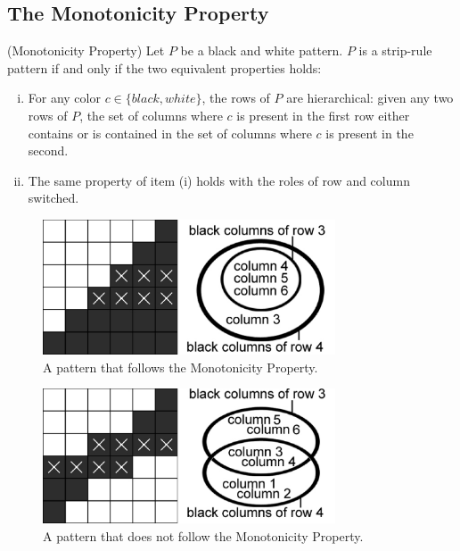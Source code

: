 
\subsection{The Monotonicity Property}
\label{ss_monoton}

\begin{theorem} 
\label{theorem_strip_rule_patterns}
(Monotonicity Property) Let $P$ be a black and white pattern. $P$ is a strip-rule pattern if and only if the two equivalent properties holds:

\begin{enumerate}[(i)]
\item For any color $c \in \{black, white\}$, the rows of $P$ are hierarchical: given any two rows of $P$, the set of columns where $c$ is present in the first row either contains or is contained in the set of columns where $c$ is present in the second.

\item The same property of item (i) holds with the roles of row and column switched.
\end{enumerate}

\begin{figure}[h]
\centering
\includegraphics[height=4cm]{monotonicity_example_good}
\caption{A pattern that follows the Monotonicity Property.}
\end{figure}

\begin{figure}[h]
\centering
\includegraphics[height=4cm]{monotonicity_example_bad}
\caption{A pattern that does not follow the Monotonicity Property.}
\end{figure}

\end{theorem}

